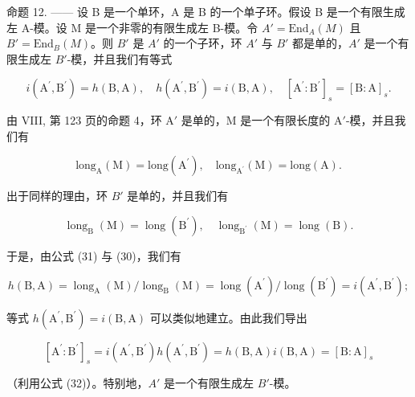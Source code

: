 命题 12. —— 设 B 是一个单环，A 是 B 的一个单子环。假设 B 是一个有限生成左 A-模。设 M 是一个非零的有限生成左 B-模。令 \(A' = \text{End}_{A}(M)\) 且 \(B' = \text{End}_{B}(M)\)。则 \(B'\) 是 \(A'\) 的一个子环，环 \(A'\) 与 \(B'\) 都是单的，\(A'\) 是一个有限生成左 \(B'\)-模，并且我们有等式

\[
i (\mathrm{A} ^ {\prime}, \mathrm{B} ^ {\prime}) = h (\mathrm{B}, \mathrm{A}), \quad h (\mathrm{A} ^ {\prime}, \mathrm{B} ^ {\prime}) = i (\mathrm{B}, \mathrm{A}), \quad [ \mathrm{A} ^ {\prime}: \mathrm{B} ^ {\prime} ] _ {s} = [ \mathrm{B}: \mathrm{A} ] _ {s}.
\]

由 VIII, 第 123 页的命题 4，环 \(\mathrm{A}'\) 是单的，\(\mathrm{M}\) 是一个有限长度的 \(\mathrm{A}'\)-模，并且我们有

\[
\mathrm{long} _ {\mathrm{A}} (\mathrm{M}) = \mathrm{long} (\mathrm{A} ^ {\prime}), \quad \mathrm{long} _ {\mathrm{A} ^ {\prime}} (\mathrm{M}) = \mathrm{long} (\mathrm{A}).
\]

出于同样的理由，环 \(B'\) 是单的，并且我们有

\[
\operatorname{long} _ {\mathrm{B}} (\mathrm{M}) = \operatorname{long} \left(\mathrm{B} ^ {\prime}\right), \quad \operatorname{long} _ {\mathrm{B} ^ {\prime}} (\mathrm{M}) = \operatorname{long} (\mathrm{B}).
\]

于是，由公式 (31) 与 (30)，我们有

\[
h (\mathrm{B}, \mathrm{A}) = \operatorname{long} _ {\mathrm{A}} (\mathrm{M}) / \operatorname{long} _ {\mathrm{B}} (\mathrm{M}) = \operatorname{long} \left(\mathrm{A} ^ {\prime}\right) / \operatorname{long} \left(\mathrm{B} ^ {\prime}\right) = i \left(\mathrm{A} ^ {\prime}, \mathrm{B} ^ {\prime}\right);
\]

等式 \(h(\mathrm{A}^{\prime},\mathrm{B}^{\prime}) = i(\mathrm{B},\mathrm{A})\) 可以类似地建立。由此我们导出

\[
[ \mathrm{A} ^ {\prime}: \mathrm{B} ^ {\prime} ] _ {s} = i (\mathrm{A} ^ {\prime}, \mathrm{B} ^ {\prime}) h (\mathrm{A} ^ {\prime}, \mathrm{B} ^ {\prime}) = h (\mathrm{B}, \mathrm{A}) i (\mathrm{B}, \mathrm{A}) = [ \mathrm{B}: \mathrm{A} ] _ {s}
\]

（利用公式 (32)）。特别地，\(A'\) 是一个有限生成左 \(B'\)-模。

